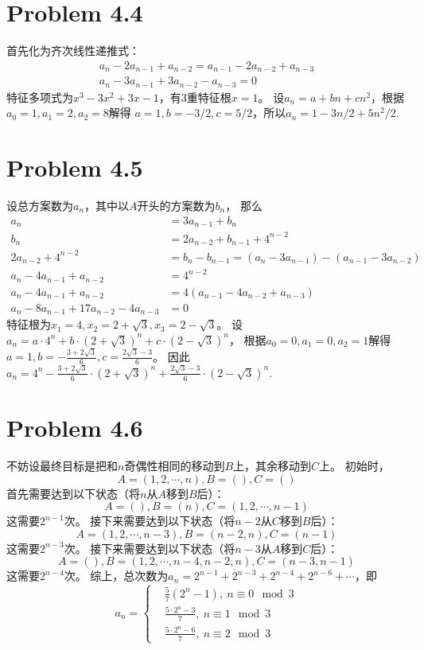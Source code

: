 \documentclass{article}
\begin{document}
\section*{Problem 4.4}
首先化为齐次线性递推式：
\begin{align*}
    a_n - 2a_{n-1} + a_{n-2} = a_{n-1} - 2a_{n-2} + a_{n-3}\\
    a_n - 3a_{n-1} + 3a_{n-2} - a_{n-3} = 0
\end{align*}
特征多项式为$x^3 - 3x^2 + 3x - 1$，有3重特征根$x=1$。
设$a_n = a + bn + cn^2$，根据$a_0 = 1, a_1 = 2, a_2 = 8$解得
$a = 1, b = -3/2, c = 5/2$，所以$a_n = 1 -3n/2 + 5n^2/2$.

\section*{Problem 4.5}
设总方案数为$a_n$，其中以$A$开头的方案数为$b_n$，
那么
\begin{align*}
    a_n &= 3a_{n-1} + b_n\\
    b_n &= 2a_{n-2} + b_{n-1} + 4^{n-2}\\
    2a_{n-2} + 4^{n-2} &= b_n - b_{n-1} = (a_n - 3a_{n-1}) - (a_{n-1} - 3a_{n-2})\\
    a_{n} - 4a_{n-1} + a_{n-2} &= 4^{n-2}\\
    a_{n} - 4a_{n-1} + a_{n-2} &= 4(a_{n-1} - 4a_{n-2} + a_{n-3})\\
    a_n - 8a_{n-1} + 17a_{n-2} -4a_{n-3} &= 0
\end{align*}
特征根为$x_1 = 4, x_2 = 2+\sqrt{3}, x_3 = 2-\sqrt{3}$。
设$a_n = a\cdot 4^n + b\cdot (2+\sqrt{3})^n + c\cdot (2-\sqrt{3})^n$，
根据$a_0 = 0, a_1 = 0, a_2 = 1$解得$a = 1, b = -\frac{3+2\sqrt{3}}{6}, c = \frac{2\sqrt{3} - 3}{6}$。
因此$a_n = 4^n -\frac{3+2\sqrt{3}}{6}\cdot (2+\sqrt{3})^n + \frac{2\sqrt{3} - 3}{6}\cdot (2-\sqrt{3})^n$.

\section*{Problem 4.6}
不妨设最终目标是把和$n$奇偶性相同的移动到$B$上，其余移动到$C$上。
初始时，$$A = (1, 2, \cdots, n), B = (), C = ()$$
首先需要达到以下状态（将$n$从$A$移到$B$后）：
$$A = (), B = (n), C = (1, 2, \cdots, n-1)$$
这需要$2^{n-1}$次。
接下来需要达到以下状态（将$n-2$从$C$移到$B$后）：
$$A = (1, 2, \cdots, n-3), B = (n-2, n), C = (n-1)$$
这需要$2^{n-3}$次。
接下来需要达到以下状态（将$n-3$从$A$移到$C$后）：
$$A = (), B = (1,2, \cdots, n-4, n-2, n), C = (n-3, n-1)$$
这需要$2^{n-4}$次。
综上，总次数为$a_n = 2^{n-1} + 2^{n-3} + 2^{n-4} + 2^{n-6} + \cdots$，即
\begin{equation*}
    a_n = \left\{
    \begin{aligned}
    & \frac{5}{7}(2^{n}-1), \ n \equiv 0 \mod 3\\
    & \frac{5\cdot 2^{n}-3}{7}, \ n \equiv 1 \mod 3\\
    & \frac{5\cdot 2^{n}-6}{7}, \ n \equiv 2 \mod 3
    \end{aligned}
    \right.
\end{equation*}
\end{document}
